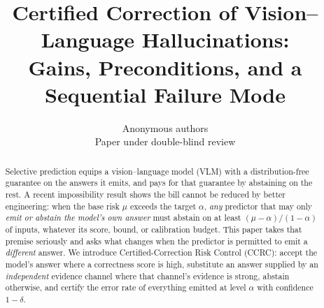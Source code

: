 \documentclass{article}
\title{Certified Correction of Vision--Language Hallucinations:\\
Gains, Preconditions, and a Sequential Failure Mode}
\author{\name Anonymous authors \\ \addr Paper under double-blind review}
\theoremstyle{plain}
\theoremstyle{definition}
\theoremstyle{remark}
\begin{document}
\maketitle

\begin{abstract}
Selective prediction equips a vision--language model (VLM) with a distribution-free
guarantee on the answers it emits, and pays for that guarantee by abstaining on the rest.
A recent impossibility result shows the bill cannot be reduced by better engineering: when
the base risk $\mu$ exceeds the target $\alpha$, \emph{any} predictor that may only
\emph{emit or abstain the model's own answer} must abstain on at least
$(\mu-\alpha)/(1-\alpha)$ of inputs, whatever its score, bound, or calibration budget.
This paper takes that premise seriously and asks what changes when the predictor is
permitted to emit a \emph{different} answer. We introduce Certified-Correction Risk
Control (CCRC): accept the model's answer where a correctness score is high, substitute an
answer supplied by an \emph{independent} evidence channel where that channel's evidence is
strong, abstain otherwise, and certify the error rate of everything emitted at level
$\alpha$ with confidence $1-\delta$.


\end{abstract}
\end{document}
